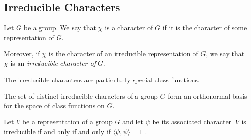 





\subsection{Irreducible Characters}

\begin{definition}
    Let $G$ be a group. We say that $\chi$ is a character of $G$ if it is the character of some representation of 
    $G$.

    Moreover, if $\chi$ is the character of an irreducible representation of $G$, we say that $\chi$ is an
    \emph{irreducible character of} $G$.
\end{definition}

The irreducible characters are particularly special class functions.
\begin{theorem}
    The set of distinct irreducible characters of a group $G$ form an orthonormal basis for the space of class 
    functions on $G$.
\end{theorem}



\begin{theorem}
    Let $V$ be a representation of a group $G$ and let $\psi$ be its associated character.  $V$ is irreducible if 
    and only if and only if $\langle \psi, \psi \rangle = 1$ .
\end{theorem}

